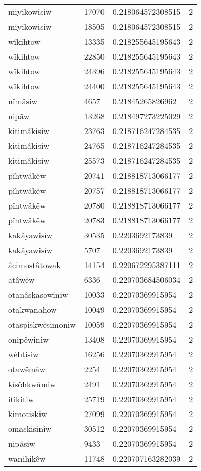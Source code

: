 \begin{longtable}{llll}
miyikowisiw & 17070 & 0.218064572308515 & 2 \\
miyikowisiw & 18505 & 0.218064572308515 & 2 \\
wîkihtow & 13335 & 0.218255645195643 & 2 \\
wîkihtow & 22850 & 0.218255645195643 & 2 \\
wîkihtow & 24396 & 0.218255645195643 & 2 \\
wîkihtow & 24400 & 0.218255645195643 & 2 \\
nîmâsiw & 4657 & 0.21845265826962 & 2 \\
nipâw & 13268 & 0.218497273225029 & 2 \\
kitimâkisiw & 23763 & 0.218716247284535 & 2 \\
kitimâkisiw & 24765 & 0.218716247284535 & 2 \\
kitimâkisiw & 25573 & 0.218716247284535 & 2 \\
pîhtwâkêw & 20741 & 0.218818713066177 & 2 \\
pîhtwâkêw & 20757 & 0.218818713066177 & 2 \\
pîhtwâkêw & 20780 & 0.218818713066177 & 2 \\
pîhtwâkêw & 20783 & 0.218818713066177 & 2 \\
kakâyawisîw & 30535 & 0.2203692173839 & 2 \\
kakâyawisîw & 5707 & 0.2203692173839 & 2 \\
âcimostâtowak & 14154 & 0.220672295387111 & 2 \\
atâwêw & 6336 & 0.220703684506034 & 2 \\
otanâskasowiniw & 10033 & 0.22070369915954 & 2 \\
otakwanahow & 10049 & 0.22070369915954 & 2 \\
otaspiskwêsimoniw & 10059 & 0.22070369915954 & 2 \\
onipêwiniw & 13408 & 0.22070369915954 & 2 \\
wêhtisiw & 16256 & 0.22070369915954 & 2 \\
otawêmâw & 2254 & 0.22070369915954 & 2 \\
kîsôhkwâmiw & 2491 & 0.22070369915954 & 2 \\
itikitiw & 25719 & 0.22070369915954 & 2 \\
kimotiskiw & 27099 & 0.22070369915954 & 2 \\
omaskisiniw & 30512 & 0.22070369915954 & 2 \\
nipâsiw & 9433 & 0.22070369915954 & 2 \\
wanihikêw & 11748 & 0.220707163282039 & 2 \\

\end{longtable}
